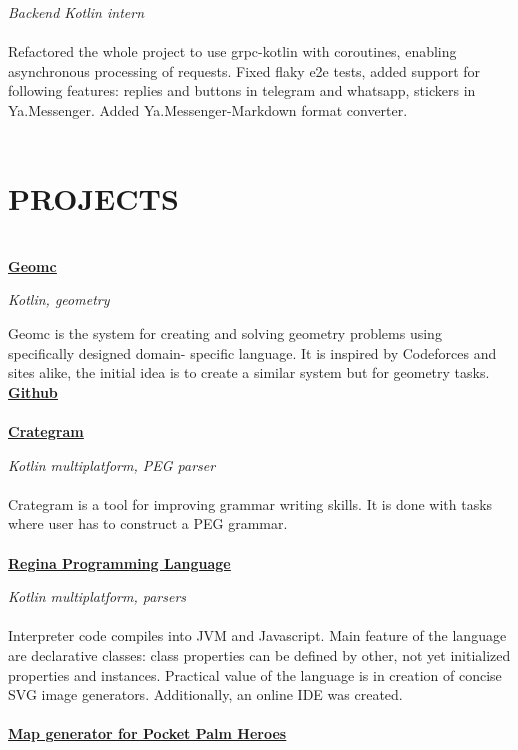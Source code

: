 \documentclass{article}
\begin{document}
\noindent \textit{Backend Kotlin intern}
\\\\
\noindent Refactored the whole project to use grpc-kotlin with coroutines, enabling asynchronous processing of requests. Fixed flaky e2e tests, added support for following features: replies and buttons in telegram and whatsapp, stickers in Ya.Messenger. Added Ya.Messenger-Markdown format converter.
\\\\
\section*{PROJECTS}
\makebox[530pt]{\rule{570pt}{0.4pt}}\\
\noindent\href{https://45.156.25.18/}{{\textbf{\underline{Geomc}}}}

\noindent\textit{Kotlin, geometry}

\noindent Geomc is the system for creating and solving geometry problems using specifically designed domain-
specific language. It is inspired by Codeforces and sites alike, the initial idea is to create a similar system
but for geometry tasks. \href{https://github.com/konichiva-geom/GeometryChecker/}{{\textbf{\underline{Github}}}}
\\\\
\noindent\href{https://llesha.github.io/CrateGram/}{{\textbf{\underline{Crategram}}}}

\noindent\textit{Kotlin multiplatform, PEG parser}
\\\\
\noindent Crategram is a tool for improving grammar writing skills. It is done with tasks where user has to construct
a PEG grammar.
\\\\
\noindent\href{https://llesha.github.io/regina/ide/}{{\textbf{\underline{Regina Programming Language}}}}

\noindent\textit{Kotlin multiplatform, parsers}
\\\\
\noindent Interpreter code compiles into JVM and Javascript. Main feature of the language are declarative classes: class properties can be defined by other, not yet initialized properties and instances. Practical value of the language is in creation of concise SVG image generators. Additionally, an online IDE was created.
\\\\
\noindent\href{https://github.com/llesha/MapGen-KorGE}{{\textbf{\underline{Map generator for Pocket Palm Heroes}}}}
\end{document}
